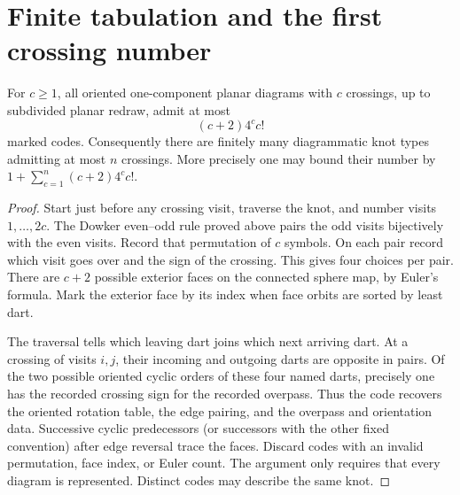 \section{Finite tabulation and the first crossing number}
\label{sec:tabulation}

\begin{proposition}
For $c\ge1$, all oriented one-component planar diagrams with $c$
crossings, up to subdivided planar redraw, admit at most
\[
                         (c+2)4^c c!
\]
marked codes. Consequently there are finitely many diagrammatic knot
types admitting at most $n$ crossings. More precisely one may bound their
number by $1+\sum_{c=1}^{n}(c+2)4^cc!$.
\end{proposition}
\begin{proof}
Start just before any crossing visit, traverse the knot, and number visits
$1,\ldots,2c$. The Dowker even--odd rule proved above pairs the odd visits
bijectively with the even visits. Record that permutation of $c$ symbols.
On each pair record which visit goes over and the sign of the crossing.
This gives four choices per pair. There are $c+2$ possible exterior
faces on the connected sphere map, by Euler's formula. Mark the exterior
face by its index when face orbits are sorted by least dart.

The traversal tells which leaving dart joins which next arriving dart.
At a crossing of visits $i,j$, their incoming and outgoing darts are
opposite in pairs. Of the two possible oriented cyclic orders of these
four named darts, precisely one has the recorded crossing sign for the
recorded overpass. Thus the code recovers the oriented rotation table,
the edge pairing, and the overpass and orientation data. Successive
cyclic predecessors (or successors with the other fixed convention)
after edge reversal trace the faces. Discard codes with an invalid
permutation, face index, or Euler count. The argument only requires
that every diagram is represented. Distinct codes may describe the same
knot.


\end{proof}
